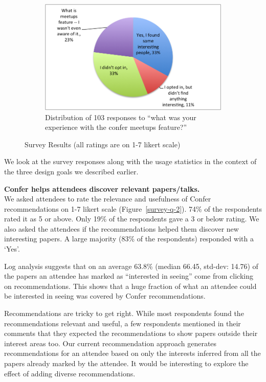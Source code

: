 \documentclass{sigchi}
\begin{document}
\begin{figure}[!h]
\vspace{10pt}
\begin{subfigure}[t]{0.9\columnwidth}
\centering
\includegraphics[width=0.9\columnwidth]{survey-q-5.png}
\caption{Distribution of 103 responses to ``what was your experience with the confer meetups feature?''}
\label{survey-q-5}
\end{subfigure}


\caption{Survey Results (all ratings are on 1-7 likert scale)}
\label{survey-responses}
\end{figure}

We look at the survey responses along with the usage statistics in the context of the three design goals we described earlier.

\textbf{Confer helps attendees discover relevant papers/talks.}\\
We asked attendees to rate the relevance and usefulness of Confer recommendations on 1-7 likert scale (Figure~\ref{survey-q-2}). 74\% of the respondents rated it as 5 or above. Only 19\% of the respondents gave a 3 or below rating. We also asked the attendees if the recommendations helped them discover new interesting papers.  A large majority (83\% of the respondents) responded with a `Yes'.

Log analysis suggests that on an average 63.8\% (median 66.45, std-dev: 14.76) of the papers an attendee has marked as ``interested in seeing'' come from clicking on recommendations. This shows that a huge fraction of what an attendee could be interested in seeing was covered by Confer recommendations.

Recommendations are tricky to get right. While most respondents found the recommendations relevant and useful, a few respondents mentioned in their comments that they expected the recommendations to show papers outside their interest areas too. Our current recommendation approach generates recommendations for an attendee based on only the interests inferred from all the papers already marked by the attendee. It would be interesting to explore the effect of adding diverse recommendations.
\end{document}
